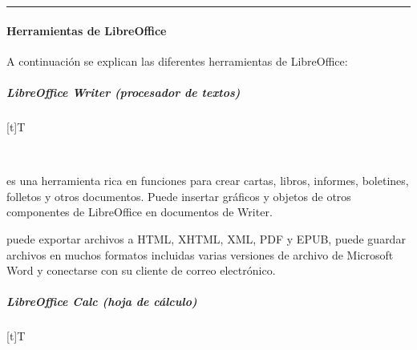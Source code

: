 \documentclass[letterpaper,10pt,spanish]{sphinxmanual}
\let\sphinxpxdimen\pdfpxdimen\else\newdimen\sphinxpxdimen
\begin{document}
\bigskip\hrule\bigskip



\paragraph{Herramientas de LibreOffice}
\label{\detokenize{cursos/ofimatica10/recursos/T03:herramientas-de-libreoffice}}
\sphinxAtStartPar
\sphinxfootnotemark[1] A continuación se explican las diferentes herramientas de LibreOffice:


\subparagraph{LibreOffice Writer (procesador de textos)}
\label{\detokenize{cursos/ofimatica10/recursos/T03:libreoffice-writer-procesador-de-textos}}

\begin{savenotes}\sphinxattablestart
\sphinxthistablewithglobalstyle
\centering
\begin{tabulary}{\linewidth}[t]{T}
\sphinxtoprule
\sphinxtableatstartofbodyhook

\begin{sphinxfigure-in-table}
\centering
\capstart
\noindent\sphinxincludegraphics[width=270\sphinxpxdimen]{{image16}.png}
\label{\detokenize{cursos/ofimatica10/recursos/T03:id8}}\end{sphinxfigure-in-table}\relax
\\
\sphinxbottomrule
\end{tabulary}
\sphinxtableafterendhook\par
\sphinxattableend\end{savenotes}

\sphinxAtStartPar
{} es una herramienta rica en funciones para crear cartas, libros, informes, boletines, folletos y otros documentos. Puede insertar gráficos y objetos de otros componentes de LibreOffice en documentos de Writer.

\sphinxAtStartPar
{} puede exportar archivos a HTML, XHTML, XML, PDF y EPUB, puede guardar archivos en muchos formatos incluidas varias versiones de archivo de Microsoft Word y conectarse con su cliente de correo electrónico.


\subparagraph{LibreOffice Calc (hoja de cálculo)}
\label{\detokenize{cursos/ofimatica10/recursos/T03:libreoffice-calc-hoja-de-calculo}}

\begin{savenotes}\sphinxattablestart
\sphinxthistablewithglobalstyle
\centering
\begin{tabulary}{\linewidth}[t]{T}
\sphinxtoprule
\sphinxtableatstartofbodyhook

\begin{sphinxfigure-in-table}
\centering
\capstart
\noindent\sphinxincludegraphics[width=190\sphinxpxdimen]{{image17}.png}
\label{\detokenize{cursos/ofimatica10/recursos/T03:id9}}\end{sphinxfigure-in-table}\relax
\\
\sphinxbottomrule
\end{tabulary}
\sphinxtableafterendhook\par
\sphinxattableend\end{savenotes}
\end{document}
